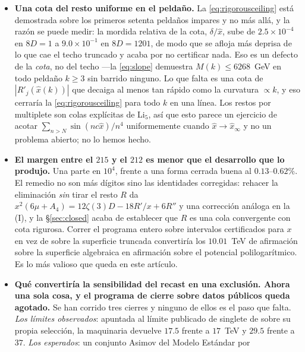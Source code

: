 \documentclass[11pt,a4paper]{article}
\begin{document}
\begin{itemize}
contenidos, los $2956$ minimizadores interiores quedan apenas $1.05$ veces más cerca del esqueleto
racional $\{1/3,1/2,2/3\}$ que el azar. El $y$ donde se sienta el tercer mínimo de un contenido
sigue debiendo leerse de sus cargas igual que se lee $\alpha_{\min}$, y no se lee ---y ahora consta
que la holonomía racional más próxima no es la forma de leerlo.
\item \textbf{Una cota del resto uniforme en el peldaño.} La \eqref{eq:rigorousceiling} está
demostrada sobre los primeros setenta peldaños impares y no más allá, y la razón se puede medir: la
mordida relativa de la cota, $\delta/\hat x$, sube de $2.5\times10^{-4}$ en $8D=1$ a
$9.0\times10^{-1}$ en $8D=1201$, de modo que se afloja más deprisa de lo que cae el techo truncado y
acaba por no certificar nada. Eso es un defecto de la \emph{cota}, no del techo ---la
\eqref{eq:slope} demuestra $M(k)\le6268$~GeV en todo peldaño $k\ge3$ sin barrido ninguno. Lo que falta
es una cota de $|R'_j(\hat x(k))|$ que decaiga al menos tan rápido como la curvatura $\propto k$, y
eso cerraría la \eqref{eq:rigorousceiling} para todo $k$ en una línea. Los restos por multiplete son
colas explícitas de Li$_5$, así que esto parece un ejercicio de acotar
$\sum_{n>N}\sin(nc\hat x)/n^4$ uniformemente cuando $\hat x\to\hat x_\infty$ y no un problema
abierto; no lo hemos hecho.
\item \textbf{El margen entre el $215$ y el $212$ es menor que el desarrollo que lo produjo.} Una
parte en $10^{4}$, frente a una forma cerrada buena al $0.13$--$0.62\%$. El remedio no son más
dígitos sino las identidades corregidas: rehacer la eliminación \emph{sin} tirar el resto $R$ da
$x^2(6\mu+A_4)=12\zeta(3)D-18R'/x+6R''$ y una corrección análoga en la (I), y la
\S\ref{sec:closed} acaba de establecer que $R$ es una cola convergente con cota rigurosa. Correr el
programa entero sobre intervalos certificados para $x$ en vez de sobre la superficie truncada
convertiría los $10.01$~TeV de afirmación sobre la superficie algebraica en afirmación sobre el
potencial polilogarítmico. Es lo más valioso que queda en este artículo.
\item \textbf{Qué convertiría la sensibilidad del recast en una exclusión. Ahora una sola cosa, y
el programa de cierre sobre datos públicos queda agotado.} Se han corrido tres cierres y ninguno
de ellos es el paso que falta. \emph{Los límites observados}: apuntada al límite publicado de
singlete de \cite{CMSangular} sobre su propia selección, la maquinaria devuelve $17.5$ frente a
$17$~TeV y $29.5$ frente a $37$. \emph{Los esperados}: un conjunto Asimov del Modelo Estándar por

\end{itemize}
\end{document}
